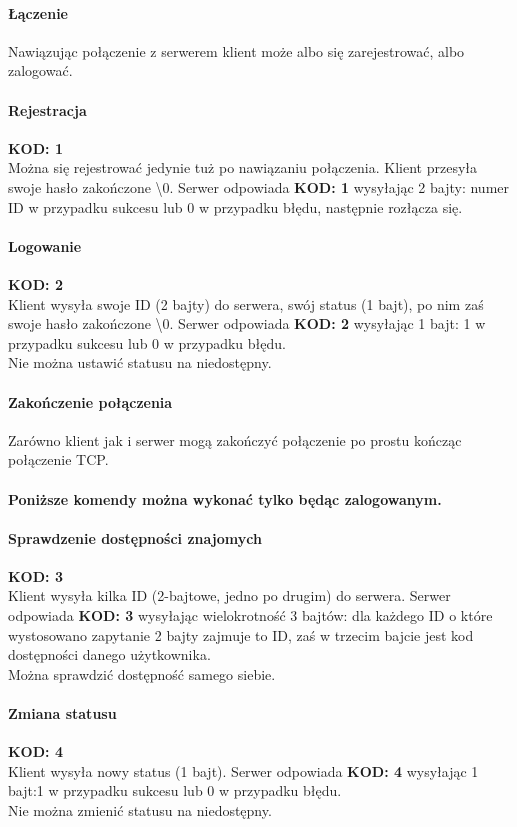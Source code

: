 \documentclass[10pt,a4paper]{article}
\newcommand{\kod}[1]{\textbf{\small{KOD: #1}}}
\begin{document}
	\paragraph{Łączenie} Nawiązując połączenie z serwerem klient może albo się zarejestrować, albo zalogować.
	\paragraph{Rejestracja}\kod{1}\\
		Można się rejestrować jedynie tuż po nawiązaniu połączenia.
		Klient przesyła swoje hasło zakończone \textbackslash{}0.
		Serwer odpowiada \kod{1} wysyłając 2 bajty: numer ID w przypadku sukcesu lub 0 w przypadku błędu,
		następnie rozłącza się.
	\paragraph{Logowanie}\kod{2}\\
		Klient wysyła swoje ID (2 bajty) do serwera, swój status (1 bajt), po nim zaś swoje hasło zakończone \textbackslash{}0.
		Serwer odpowiada \kod{2} wysyłając 1 bajt: 1 w przypadku sukcesu lub 0 w przypadku błędu.\\
		Nie można ustawić statusu na niedostępny.
	\paragraph{Zakończenie połączenia} Zarówno klient jak i serwer mogą zakończyć połączenie po prostu
		kończąc połączenie TCP.
	
	\paragraph{} \textbf{Poniższe komendy można wykonać tylko będąc zalogowanym.}
	\paragraph{Sprawdzenie dostępności znajomych}\kod{3}\\
		Klient wysyła kilka ID (2-bajtowe, jedno po drugim) do serwera.
		Serwer odpowiada \kod{3} wysyłając wielokrotność 3 bajtów: dla każdego ID o które wystosowano zapytanie
		2 bajty zajmuje to ID, zaś w trzecim bajcie jest kod dostępności danego użytkownika.\\
		Można sprawdzić dostępność samego siebie.
	\paragraph{Zmiana statusu}\kod{4}\\
		Klient wysyła nowy status (1 bajt).
		Serwer odpowiada \kod{4} wysyłając 1 bajt:1 w przypadku sukcesu lub 0 w przypadku błędu.\\
		Nie można zmienić statusu na niedostępny.
\end{document}
